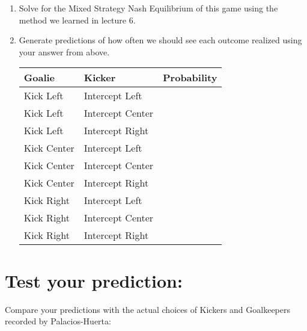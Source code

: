\documentclass[12pt]{exam}
\begin{document}
\begin{enumerate}

  \item Solve for the Mixed Strategy Nash Equilibrium of this game
  using the method we learned in lecture 6.

  \vspace{25mm}

  \item Generate predictions of how often we should see each outcome realized using your answer from above.

  \begin{center}
    \begin{tabular}{|l|l|c|}
      \textbf{Goalie} & \textbf{Kicker} & \textbf{Probability} \\ \hline \hline
      Kick Left   & Intercept Left   &   \\ \hline
      Kick Left   & Intercept Center &   \\ \hline
      Kick Left   & Intercept Right  &   \\ \hline
      Kick Center & Intercept Left   &   \\ \hline
      Kick Center & Intercept Center &   \\ \hline
      Kick Center & Intercept Right  &   \\ \hline
      Kick Right  & Intercept Left   &   \\ \hline
      Kick Right  & Intercept Center &   \\ \hline
      Kick Right  & Intercept Right  &   \\ \hline
    \end{tabular}
    
  \end{center}

\end{enumerate}

\newpage

\section*{Test your prediction:}

Compare your predictions with the actual choices of Kickers and Goalkeepers recorded by Palacios-Huerta: 
\end{document}

